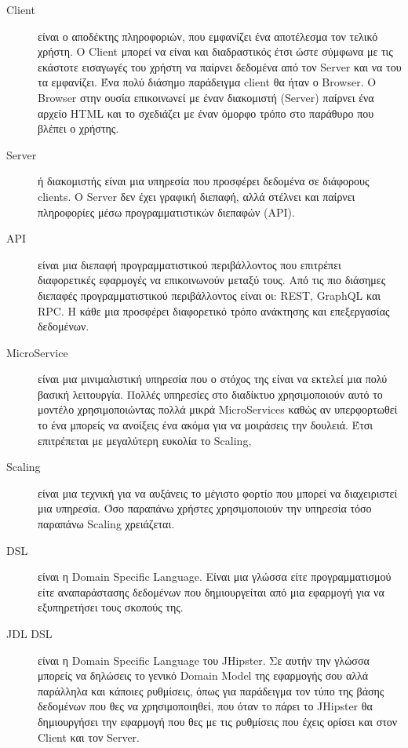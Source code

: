 \begin{Definitions}
\begin{description}
    \item [Client] είναι ο αποδέκτης πληροφοριών, που εμφανίζει ένα αποτέλεσμα τον τελικό χρήστη. Ο Client μπορεί να είναι και διαδραστικός έτσι ώστε σύμφωνα με τις εκάστοτε εισαγωγές του χρήστη να παίρνει δεδομένα από τον Server και να του τα εμφανίζει. Ένα πολύ διάσημο παράδειγμα client θα ήταν ο Browser. Ο Browser στην ουσία επικοινωνεί με έναν διακομιστή (Server) παίρνει ένα αρχείο HTML και το σχεδιάζει με έναν όμορφο τρόπο στο παράθυρο που βλέπει ο χρήστης.
    \item [Server] ή διακομιστής είναι μια υπηρεσία που προσφέρει δεδομένα σε διάφορους clients. Ο Server δεν έχει γραφική διεπαφή, αλλά στέλνει και παίρνει πληροφορίες μέσω προγραμματιστικών διεπαφών (API). 
    \item [API] είναι μια διεπαφή προγραμματιστικού περιβάλλοντος που επιτρέπει διαφορετικές εφαρμογές να επικοινωνούν μεταξύ τους. Από τις πιο διάσημες διεπαφές προγραμματιστικού περιβάλλοντος είναι οι: REST, GraphQL και RPC. Η κάθε μια προσφέρει διαφορετικό τρόπο ανάκτησης και επεξεργασίας δεδομένων.
    \item [MicroService] είναι μια μινιμαλιστική υπηρεσία που ο στόχος της είναι να εκτελεί μια πολύ βασική λειτουργία. Πολλές υπηρεσίες στο διαδίκτυο χρησιμοποιούν αυτό το μοντέλο χρησιμοποιώντας πολλά μικρά MicroServices καθώς αν υπερφορτωθεί το ένα μπορείς να ανοίξεις ένα ακόμα για να μοιράσεις την δουλειά. Έτσι επιτρέπεται με μεγαλύτερη ευκολία το Scaling, 
    \item [Scaling] είναι μια τεχνική για να αυξάνεις το μέγιστο φορτίο που μπορεί να διαχειριστεί μια υπηρεσία. Όσο παραπάνω χρήστες χρησιμοποιούν την υπηρεσία τόσο παραπάνω Scaling χρειάζεται.
    \item [DSL] είναι η Domain Specific Language. Είναι μια γλώσσα είτε προγραμματισμού είτε αναπαράστασης δεδομένων που δημιουργείται από μια εφαρμογή για να εξυπηρετήσει τους σκοπούς της. 
    \item [JDL DSL] είναι η Domain Specific Language του JHipster. Σε αυτήν την γλώσσα μπορείς να δηλώσεις το γενικό Domain Model της εφαρμογής σου αλλά παράλληλα και κάποιες ρυθμίσεις, όπως για παράδειγμα τον τύπο της βάσης δεδομένων που θες να χρησιμοποιηθεί, που όταν το πάρει το JHipster θα δημιουργήσει την εφαρμογή που θες με τις ρυθμίσεις που έχεις ορίσει και στον Client και τον Server.
\end{description}

\end{Definitions}